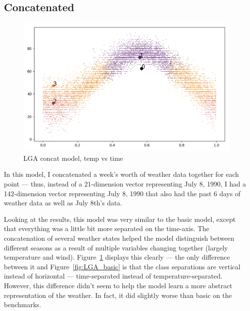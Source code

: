\documentclass[a4paper]{article}
\begin{document}
\subsection{Concatenated}
\begin{figure}[t]
  \centering
  \includegraphics[width=\linewidth]{../png/models/LGA-concat-temperature4.png}
  \caption{LGA concat model, temp vs time}
  \label{fig:LGA_concat}
\end{figure}

In this model, I concatenated a week's worth of weather data together for each point --- thus, instead of a 21-dimension vector representing July 8, 1990, I had a 142-dimension vector representing July 8, 1990 that also had the past 6 days of weather data as well as July 8th's data. 

Looking at the results, this model was very similar to the basic model, except that everything was a little bit more separated on the time-axis. The concatenation of several weather states helped the model distinguish between different seasons as a result of multiple variables changing together (largely temperature and wind). Figure~\ref{fig:LGA_concat} displays this clearly --- the only difference between it and Figure~\ref{fig:LGA_basic} is that the class separations are vertical instead of horizontal --- time-separated instead of temperature-separated. However, this difference didn't seem to help the model learn a more abstract representation of the weather. In fact, it did slightly worse than basic on the benchmarks.
\end{document}

